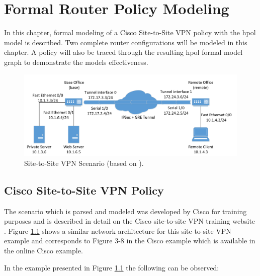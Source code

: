\documentclass[12pt,letterpaper]{report}
\begin{document}
\chapter{Formal Router Policy Modeling}
\label{Chapter:CiscoRouterPolicyModeling}

In this chapter, formal modeling of a Cisco Site-to-Site VPN policy with the \ac{hpol} model is described. Two complete router configurations will be modeled in this chapter. A policy will also be traced through the resulting \ac{hpol} formal model graph to demonstrate the models effectiveness.

\begin{figure}
	\centering
	\includegraphics[width=\textwidth]{hpolVPNexample.pdf}
	\caption{Site-to-Site VPN Scenario (based on {\cite{CiscoVPNExampleWebLink}}).}%
	\label{CiscoVPNExample}%
\end{figure}%

\section {Cisco Site-to-Site VPN Policy}
\label{Chapter:ExemplarCiscoVPN}

{The scenario which is parsed and modeled was developed by Cisco for training purposes and is described in detail on the Cisco site-to-site VPN training website {\cite{CiscoVPNExampleWebLink}}. Figure {\ref{CiscoVPNExample}} shows a similar network architecture for this site-to-site VPN example and corresponds to Figure 3-8 in the Cisco example which is available in the online Cisco example.}

{In the example presented in Figure {\ref{CiscoVPNExample}} the following can be observed:}
\end{document}
